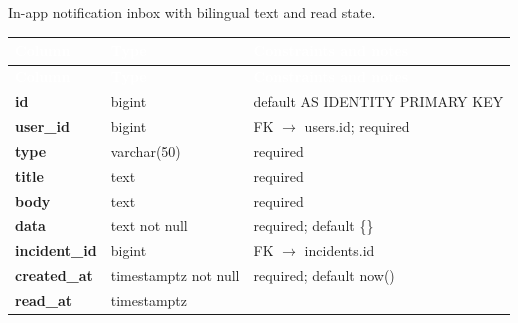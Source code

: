 \subsection*{}
In-app notification inbox with bilingual text and read state.\par\vspace{2pt}
{\tabfont\rowband
\begin{longtable}{@{}>{\raggedright\arraybackslash}p{}>{\raggedright\arraybackslash}p{}>{\raggedright\arraybackslash}p{}@{}}
\rowcolor{najdanavy}\textcolor{white}{\sffamily\bfseries\small Column} & \textcolor{white}{\sffamily\bfseries\small Type} & \textcolor{white}{\sffamily\bfseries\small Constraints and notes}\\
\endfirsthead
\rowcolor{najdanavy}\textcolor{white}{\sffamily\bfseries\small Column} & \textcolor{white}{\sffamily\bfseries\small Type} & \textcolor{white}{\sffamily\bfseries\small Constraints and notes}\\
\endhead
\bottomrule\endlastfoot
\textbf{id} & bigint & default AS IDENTITY PRIMARY KEY\\
\textbf{user\_\allowbreak{}id} & bigint & FK $\rightarrow$ users.id; required\\
\textbf{type} & varchar(50) & required\\
\textbf{title} & text & required\\
\textbf{body} & text & required\\
\textbf{data} & text not null & required; default \{\}\\
\textbf{incident\_\allowbreak{}id} & bigint & FK $\rightarrow$ incidents.id\\
\textbf{created\_\allowbreak{}at} & timestamptz not null & required; default now()\\
\textbf{read\_\allowbreak{}at} & timestamptz & \\
\end{longtable}}

